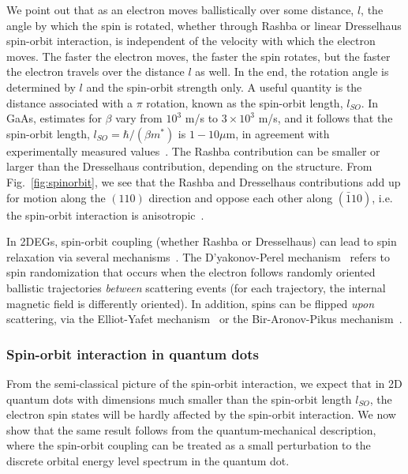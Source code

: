 \documentclass[rmp,twocolumn,aps]{revtex4}
\begin{document}
We point out that as an electron moves ballistically over some
distance, $l$, the angle by which the spin is rotated, whether
through Rashba or linear Dresselhaus spin-orbit interaction, is
independent of the velocity with which the electron moves. The
faster the electron moves, the faster the spin rotates, but the
faster the electron travels over the distance $l$ as well. In the
end, the rotation angle is determined by $l$ and the spin-orbit
strength only. A useful quantity is the distance associated with a
$\pi$ rotation, known as the spin-orbit length, $l_{SO}$. In GaAs,
estimates for $\beta$ vary from $10^3$ m/s to $3\times 10^3$ m/s,
and it follows that the spin-orbit length, $l_{SO} = \hbar /
(\beta m^*)$ is $1-10 \mu$m, in agreement with experimentally
measured values~\cite{zumbuhl02}. The Rashba contribution can be
smaller or larger than the Dresselhaus contribution, depending on
the structure. From Fig.~\ref{fig:spinorbit}, we see that the
Rashba and Dresselhaus contributions add up for motion along
the $(110)$ direction and oppose each other along $(\bar{1}10)$, i.e. 
the spin-orbit interaction is anisotropic~\cite{Haug05}.

In 2DEGs, spin-orbit coupling (whether Rashba or Dresselhaus) can lead to spin relaxation via several mechanisms~\cite{zutic04}. The D'yakonov-Perel mechanism~\cite{dyakonov71,wrinkler03} refers to spin randomization that occurs when the electron follows randomly oriented ballistic trajectories \emph{between} scattering events (for each trajectory, the internal magnetic field is differently oriented). In addition, spins can be flipped \emph{upon} scattering, via the Elliot-Yafet mechanism~\cite{elliott54,yafet63} or the Bir-Aronov-Pikus mechanism~\cite{bir75}.


\subsubsection{Spin-orbit interaction in quantum dots}

From the semi-classical picture of the spin-orbit interaction, we
expect that in 2D quantum dots with dimensions much smaller than
the spin-orbit length $l_{SO}$, the electron spin states will be
hardly affected by the spin-orbit interaction. We now show that the same result follows from the quantum-mechanical description, where the
spin-orbit coupling can be treated as a small perturbation to the
discrete orbital energy level spectrum in the quantum dot.
\end{document}
